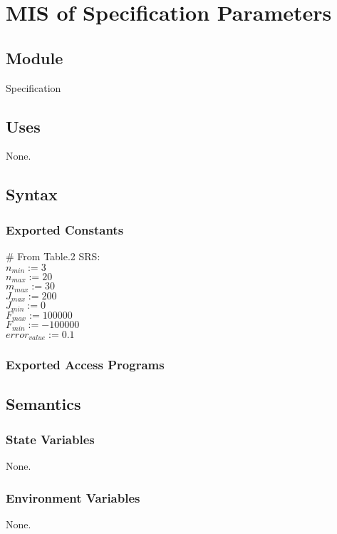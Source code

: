 \documentclass[12pt, titlepage]{article}
\begin{document}
\section{MIS of Specification Parameters \label{mSpec} }

\subsection{Module}

Specification

\subsection{Uses}
None.

\subsection{Syntax}

\subsubsection{Exported Constants}
$\#$ From Table.2 SRS: \\
$n_{min}:=3$\\
$n_{max}:=20$\\
$m_{max}:=30$\\
$J_{max}:=200$\\
$J_{min}:=0$\\
$F_{max}:=100000$\\
$F_{min}:=-100000$\\
$error_{value}:=0.1$



\subsubsection{Exported Access Programs}

\subsection{Semantics}
\subsubsection{State Variables}
None.

\subsubsection{Environment Variables}
None.
\end{document}
